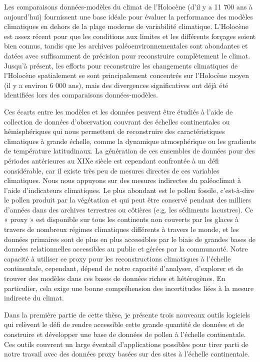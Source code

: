 \renewcommand{\abstractname}{Résumé}
\begin{thesisabstract}[]
\addchaptertocentry{\abstractname}
Les comparaisons données-modèles du climat de l'Holocène (d’il y a 11 700 ans à aujourd'hui) fournissent une base idéale pour évaluer la performance des modèles climatiques en dehors de la plage moderne de variabilité climatique. L'Holocène est assez récent pour que les conditions aux limites et les différents forçages soient bien connus, tandis que les archives paléoenvironnementales sont abondantes et datées avec suffisamment de précision pour reconstruire complètement le climat. Jusqu'à présent, les efforts pour reconstruire les changements climatiques de l'Holocène spatialement se sont principalement concentrés sur l'Holocène moyen (il y a environ 6 000 ans), mais des divergences significatives ont déjà été identifiées lors des comparaisons données-modèles.

Ces écarts entre les modèles et les données peuvent être étudiés à l'aide de collection de données d'observation couvrant des échelles continentales ou hémisphériques qui nous permettent de reconstruire des caractéristiques climatiques à grande échelle, comme la dynamique atmosphérique ou les gradients de température latitudinaux. La génération de ces ensembles de données pour des périodes antérieures au XIXe siècle est cependant confrontée à un défi considérable, car il existe très peu de mesures directes de ces variables climatiques. Nous nous appuyons sur des mesures indirectes du paléoclimat à l'aide d'indicateurs climatiques. Le plus abondant est le pollen fossile, c'est-à-dire le pollen produit par la végétation et qui peut être conservé pendant des milliers d'années dans des archives terrestres ou côtières (e.g. les sédiments lacustres). Ce « proxy » est disponible sur tous les continents non couverts par les glaces à travers de nombreux régimes climatiques différents à travers le monde, et les données primaires sont de plus en plus accessibles par le biais de grandes bases de données relationnelles accessibles au public et gérées par la communauté. Notre capacité à utiliser ce proxy pour les reconstructions climatiques à l'échelle continentale, cependant, dépend de notre capacité d'analyser, d'explorer et de trouver des modèles dans ces bases de données riches et hétérogènes. En particulier, cela exige une bonne compréhension des incertitudes liées à la mesure indirecte du climat.

Dans la première partie de cette thèse, je présente trois nouveaux outils logiciels qui relèvent le défi de rendre accessible cette grande quantité de données et de construire et développer une base de données de pollen à l'échelle continentale. Ces outils couvrent un large éventail d'applications possibles pour tirer parti de notre travail avec des données proxy basées sur des sites à l'échelle continentale.


\end{thesisabstract}
